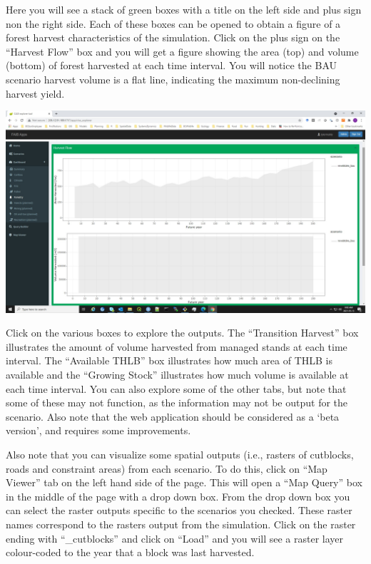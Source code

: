 \documentclass[
]{article}
\begin{document}
Here you will see a stack of green boxes with a title on the left side
and plus sign non the right side. Each of these boxes can be opened to
obtain a figure of a forest harvest characteristics of the simulation.
Click on the plus sign on the ``Harvest Flow'' box and you will get a
figure showing the area (top) and volume (bottom) of forest harvested at
each time interval. You will notice the BAU scenario harvest volume is a
flat line, indicating the maximum non-declining harvest yield.

\includegraphics{images/clus_explorer_harvestflow.jpg}

Click on the various boxes to explore the outputs. The ``Transition
Harvest'' box illustrates the amount of volume harvested from managed
stands at each time interval. The ``Available THLB'' box illustrates how
much area of THLB is available and the ``Growing Stock'' illustrates how
much volume is available at each time interval. You can also explore
some of the other tabs, but note that some of these may not function, as
the information may not be output for the scenario. Also note that the
web application should be considered as a `beta version', and requires
some improvements.

Also note that you can visualize some spatial outputs (i.e., rasters of
cutblocks, roads and constraint areas) from each scenario. To do this,
click on ``Map Viewer'' tab on the left hand side of the page. This will
open a ``Map Query'' box in the middle of the page with a drop down box.
From the drop down box you can select the raster outputs specific to the
scenarios you checked. These raster names correspond to the rasters
output from the simulation. Click on the raster ending with
``\_cutblocks'' and click on ``Load'' and you will see a raster layer
colour-coded to the year that a block was last harvested.
\end{document}
